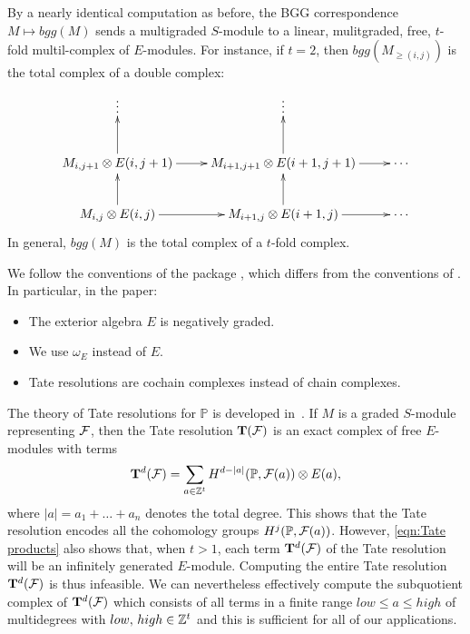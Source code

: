 \documentclass[twoside,12pt, leqno]{amsart}
\def\PP{{\mathbb P}}
\def\bT{{\bf T}}
\begin{document}
By a nearly identical computation as before, the BGG correspondence $M\mapsto bgg(M)$ sends a multigraded $S$-module to a linear, mulitgraded, free, $t$-fold multil-complex of $E$-modules.  For instance, if $t=2$, then $bgg(M_{\ge(i,j)})$ is the total complex of a double complex:
\begin{equation}\label{eqn:uppercorner}
\xymatrix{ \vdots & \vdots & \\
 M_{i,j+1}\otimes E(i,j+1) \ar[r]\ar[u]& M_{i+1,j+1}\otimes E(i+1,j+1)\ar[u] \ar[r] & \cdots \\
 M_{i,j}\otimes E(i,j) \ar[r]\ar[u]& M_{i+1,j}\otimes E(i+1,j) \ar[u]  \ar[r] & \cdots \\
}
\end{equation}
In general, $bgg(M)$ is the total complex of a $t$-fold complex.


\begin{remark}\label{rmk:conventions}
We follow the conventions of the package \cite{TateOnProducts}, which differs from the conventions of \cite{EES}. In particular, in the paper:
\begin{itemize}
\item The exterior algebra $E$ is negatively graded.
\item We use $\omega_E$ instead of $E.$
\item Tate resolutions are cochain complexes instead of chain complexes.
\end{itemize}
\end{remark}

The theory of Tate resolutions for 
$
\PP$ is developed in~\cite{EES}.  If $M$ is a graded $S$-module representing ${\mathcal F}$, then the Tate resolution $\bT(\sF)$ is an
exact complex of free $E$-modules with terms
\begin{equation}\label{eqn:Tate products}
\bT^d(\sF)= \sum_{a \in \ZZ^t} H^{d-|a|}(\PP,\sF(a)) \otimes E(a),
\end{equation}
where $|a|=a_1+\ldots+a_n$ denotes the total degree.
This shows that the Tate resolution encodes all the cohomology groups
$ H^j(\PP, \sF(a))$.
However, \eqref{eqn:Tate products} also shows that, when $t>1$, each term $\bT^d(\sF)$ of the Tate resolution will be an infinitely generated $E$-module. Computing the entire Tate resolution $\bT^d(\sF)$ is thus infeasible.  We can nevertheless  effectively compute the subquotient complex of $\bT^d(\sF)$ which consists of all terms in a finite range
$
low \le a \le high
$
of multidegrees with $low, \, high \in {\mathbb Z}^t $ and this is sufficient for all of our applications.
\end{document}
